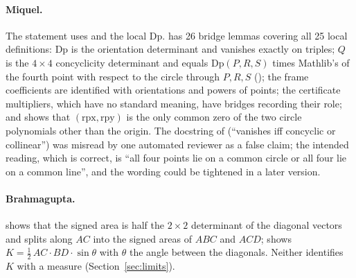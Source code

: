 \documentclass[11pt]{article}
\theoremstyle{definition}
\theoremstyle{remark}
\begin{document}
\paragraph{Miquel.} The statement uses  and the local $\mathrm{Dp}$.
 has 26 bridge lemmas covering all 25 local definitions: $\mathrm{Dp}$ is
the orientation determinant and vanishes exactly on  triples; $Q$ is the
$4\times4$ concyclicity determinant and equals $\mathrm{Dp}(P,R,S)$ times Mathlib's
 of the fourth point with respect to the circle through
$P,R,S$ (); the frame coefficients are identified with orientations
and powers of points; the certificate multipliers, which have no standard meaning, have bridges
recording their role; and  shows that $(\mathrm{rpx},\mathrm{rpy})$ is
the only common zero of the two circle polynomials other than the origin. The docstring of
 (``vanishes iff concyclic or collinear'') was misread by one automated reviewer as
a false claim; the intended reading, which is correct, is ``all four points lie on a common circle
or all four lie on a common line'', and the wording could be tightened in a later version.

\paragraph{Brahmagupta.}  shows that the signed area is half
the $2\times2$ determinant of the diagonal vectors and splits along $AC$ into the signed areas of
$ABC$ and $ACD$;  shows
$K=\tfrac12\,AC\cdot BD\cdot\sin\theta$ with $\theta$ the angle between the diagonals. Neither
identifies $K$ with a measure (Section~\ref{sec:limits}).
\end{document}

